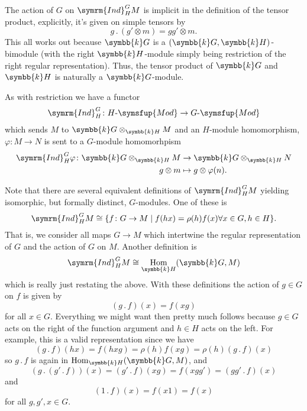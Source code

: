 \documentclass[fleqn]{NotesClass}
\makeatletter
\renewcommand{\field}{\symbb{k}}
\DeclareMathOperator{\Hom}{Hom}
\newcommand{\action}{\mathbin{.}}
\newcommand{\c@egory}[1]{\symsfup{#1}}
\newcommand{\Mod}[1]{#1\text{-}\c@egory{Mod}}
\newcommand{\isomorphic}{\cong}
\newcommand{\Ind}{\symrm{Ind}}
\makeatother
\begin{document}
    The action of \(G\) on \(\Ind^G_H M\) is implicit in the definition of the tensor product, explicitly, it's given on simple tensors by
    \begin{equation}
        g \action (g' \otimes m) = gg' \otimes m.
    \end{equation}
    This all works out because \(\field G\) is a \((\field G, \field H)\)-bimodule (with the right \(\field H\)-module simply being restriction of the right regular representation).
    Thus, the tensor product of \(\field G\) and \(\field H\) is naturally a \(\field G\)-module.
    
    As with restriction we have a functor
    \begin{equation}
        \Ind^G_H \colon \Mod{H} \to \Mod{G}
    \end{equation}
    which sends \(M\) to \(\field G \otimes_{\field H} M\) and an \(H\)-module homomorphism, \(\varphi \colon M \to N\) is sent to a \(G\)-module homomorhpism
    \begin{align}
        \Ind^G_H \varphi \colon \field G \otimes_{\field H} M &\to \field G \otimes_{\field H} N\\
        g \otimes m &\mapsto g \otimes \varphi(n).
    \end{align}
    
    Note that there are several equivalent definitions of \(\Ind^G_H M\) yielding isomorphic, but formally distinct, \(G\)-modules.
    One of these is
    \begin{equation}
        \Ind^G_H M \isomorphic \{f \colon G \to M \mid f(hx) = \rho(h)f(x) \forall x \in G, h \in H\}.
    \end{equation}
    That is, we consider all maps \(G \to M\) which intertwine the regular representation of \(G\) and the action of \(G\) on \(M\).
    Another definition is
    \begin{equation}
        \Ind^G_H M \isomorphic \Hom_{\field H}(\field G, M)
    \end{equation}
    which is really just restating the above.
    With these definitions the action of \(g \in G\) on \(f\) is given by
    \begin{equation}
        (g \action f)(x) = f(xg)
    \end{equation}
    for all \(x \in G\).
    Everything we might want then pretty much follows because \(g \in G\) acts on the right of the function argument and \(h \in H\) acts on the left.
    For example, this is a valid representation since we have
    \begin{equation}
        (g \action f)(hx) = f(hxg) = \rho(h)f(xg) = \rho(h)(g \action f)(x)
    \end{equation}
    so \(g \action f\) is again in \(\Hom_{\field H}(\field G, M)\), and
    \begin{equation}
        (g \action (g' \action f))(x) = (g' \action f)(xg) = f(xgg') = (gg' \action f)(x)
    \end{equation}
    and
    \begin{equation}
        (1 \action f)(x) = f(x1) = f(x)
    \end{equation}
    for all \(g, g', x \in G\).
    
\end{document}
